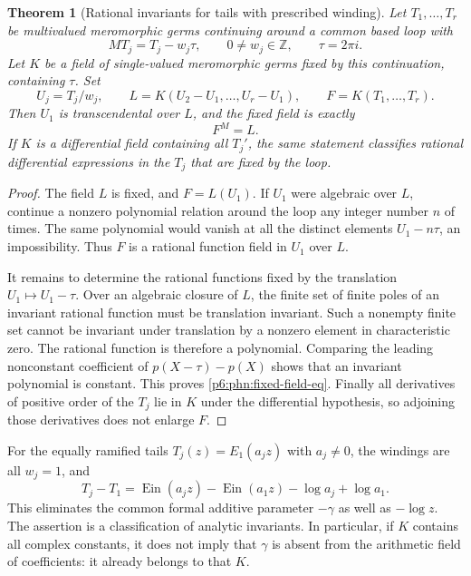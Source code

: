 \documentclass[11pt,a4paper]{article}
\newtheorem{theorem}{Theorem}[section]
\theoremstyle{definition}
\theoremstyle{remark}
\numberwithin{equation}{section}
\begin{document}
\begin{theorem}[Rational invariants for tails with prescribed winding]
\label{p6:phn:fixed-field}
Let $T_1,\ldots,T_r$ be multivalued meromorphic germs continuing
around a common based loop with
\[
 M T_j=T_j-w_j\tau,\qquad 0\ne w_j\in\mathbb Z,
 \qquad \tau=2\pi i.
\]
Let $K$ be a field of single-valued meromorphic germs fixed by this
continuation, containing $\tau$.  Set
\[
 U_j=T_j/w_j,\qquad
 L=K(U_2-U_1,\ldots,U_r-U_1),\qquad
 F=K(T_1,\ldots,T_r).
\]
Then $U_1$ is transcendental over $L$, and the fixed field is exactly
\begin{equation}\label{p6:phn:fixed-field-eq}
 F^{M}=L.
\end{equation}
If $K$ is a differential field containing all $T_j'$, the same
statement classifies rational differential expressions in the $T_j$
that are fixed by the loop.
\end{theorem}
\begin{proof}
The field $L$ is fixed, and $F=L(U_1)$.  If $U_1$ were algebraic over
$L$, continue a nonzero polynomial relation around the loop any
integer number $n$ of times.  The same polynomial would vanish at
all the distinct elements $U_1-n\tau$, an impossibility.  Thus $F$
is a rational function field in $U_1$ over $L$.

It remains to determine the rational functions fixed by the
translation $U_1\mapsto U_1-\tau$.  Over an algebraic closure of
$L$, the finite set of finite poles of an invariant rational function
must be translation invariant.  Such a nonempty finite set cannot
be invariant under translation by a nonzero element in characteristic
zero.  The rational function is therefore a polynomial.  Comparing
the leading nonconstant coefficient of $p(X-\tau)-p(X)$ shows that
an invariant polynomial is constant.  This proves
\eqref{p6:phn:fixed-field-eq}.  Finally all derivatives of positive order
of the $T_j$ lie in $K$ under the differential hypothesis, so adjoining
those derivatives does not enlarge $F$.
\end{proof}

For the equally ramified tails $T_j(z)=E_1(a_jz)$ with $a_j\ne0$,
the windings are all $w_j=1$, and
\begin{equation}\label{p6:phn:same-winding}
 T_j-T_1=\operatorname{Ein}(a_jz)-\operatorname{Ein}(a_1z)
                  -\log a_j+\log a_1.
\end{equation}
This eliminates the common formal additive parameter $-\gamma$ as
well as $-\log z$.  The assertion is a classification of analytic
invariants.  In particular, if $K$ contains all complex constants,
it does not imply that $\gamma$ is absent from the arithmetic field
of coefficients: it already belongs to that $K$.
\end{document}
